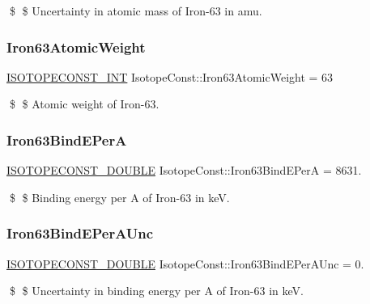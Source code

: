 \$ \$ Uncertainty in atomic mass of Iron-\/63 in amu. \mbox{\label{group___isotope_const-_iron-_fe63_gafc00c7f585c0c17784de25eb113bd5c8}} 
\subsubsection{\texorpdfstring{Iron63\+Atomic\+Weight}{Iron63AtomicWeight}}
{\footnotesize\ttfamily \mbox{\hyperlink{group___isotope_const-_macros_ga5f18360b3e99483a35c32d789e62621c}{I\+S\+O\+T\+O\+P\+E\+C\+O\+N\+S\+T\+\_\+\+I\+NT}} Isotope\+Const\+::\+Iron63\+Atomic\+Weight = 63}

\$ \$ Atomic weight of Iron-\/63. \mbox{\label{group___isotope_const-_iron-_fe63_gae16f8bf37221300c5a287aef77109f01}} 
\subsubsection{\texorpdfstring{Iron63\+Bind\+E\+PerA}{Iron63BindEPerA}}
{\footnotesize\ttfamily \mbox{\hyperlink{group___isotope_const-_macros_ga8f45a7272ce02c0b4c65c44636ed719a}{I\+S\+O\+T\+O\+P\+E\+C\+O\+N\+S\+T\+\_\+\+D\+O\+U\+B\+LE}} Isotope\+Const\+::\+Iron63\+Bind\+E\+PerA = 8631.}

\$ \$ Binding energy per A of Iron-\/63 in keV. \mbox{\label{group___isotope_const-_iron-_fe63_ga76d1efb0a38e7d5c40398eb280d9e774}} 
\subsubsection{\texorpdfstring{Iron63\+Bind\+E\+Per\+A\+Unc}{Iron63BindEPerAUnc}}
{\footnotesize\ttfamily \mbox{\hyperlink{group___isotope_const-_macros_ga8f45a7272ce02c0b4c65c44636ed719a}{I\+S\+O\+T\+O\+P\+E\+C\+O\+N\+S\+T\+\_\+\+D\+O\+U\+B\+LE}} Isotope\+Const\+::\+Iron63\+Bind\+E\+Per\+A\+Unc = 0.}

\$ \$ Uncertainty in binding energy per A of Iron-\/63 in keV. \mbox{\label{group___isotope_const-_iron-_fe63_gaac9e1eaa4a95329325c87a33a1964120}} 
